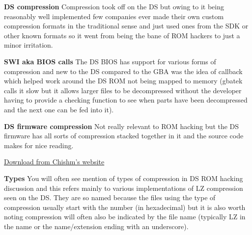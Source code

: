 \documentclass[
]{book}
\begin{document}
\textbf{DS compression} Compression took off on the DS but owing to it being reasonably well implemented few companies ever made their own custom compression formats in the traditional sense and just used ones from the SDK or other known formats so it went from being the bane of ROM hackers to just a minor irritation.

\textbf{SWI aka BIOS calls} The DS BIOS has support for various forms of compression and new to the DS compared to the GBA was the idea of callback which helped work around the DS ROM not being mapped to memory (gbatek calls it slow but it allows larger files to be decompressed without the developer having to provide a checking function to see when parts have been decompressed and the next one can be fed into it).

\textbf{DS firmware compression} Not really relevant to ROM hacking but the DS firmware has all sorts of compression stacked together in it and the source code makes for nice reading.

\href{http://chishm.drunkencoders.com/NDS_Projects/fwunpack.zip}{Download from Chishm's website}

\textbf{Types} You will often see mention of types of compression in DS ROM hacking discussion and this refers mainly to various implementations of LZ compression seen on the DS. They are so named because the files using the type of compression usually start with the number (in hexadecimal) but it is also worth noting compression will often also be indicated by the file name (typically LZ in the name or the name/extension ending with an underscore).
\end{document}
